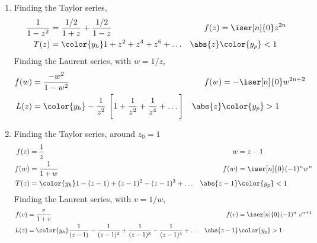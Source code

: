 \begin{enumerate}
    \item Finding the Taylor series,
          \begin{align}
              \frac{1}{1-z^2} & = \frac{1/2}{1+z} + \frac{1/2}{1-z}       &
              f(z)            & = \iser[n]{0} z^{2n}                        \\
              T(z)            & = \color{y_h} 1 + z^2 + z^4 + z^6 + \dots &
              \abs{z}         & \color{y_p} < 1
          \end{align}
          Finding the Laurent series, with $ w = 1/z $,
          \begin{align}
              f(w)    & = \frac{-w^2}{1 - w^2}                                 &
              f(w)    & = -\iser[n]{0} w^{2n + 2}                                \\
              L(z)    & = \color{y_h} -\frac{1}{z^2}\ \Bigg[ 1 + \frac{1}{z^2}
                  + \frac{1}{z^4} + \dots
              \Bigg]  &
              \abs{z} & \color{y_p} > 1
          \end{align}

    \item Finding the Taylor series, around $ z_0 = 1 $
          \begin{align}
              f(z)        & = \frac{1}{z}                                       &
              w           & = z - 1                                               \\
              f(w)        & = \frac{1}{1 + w}                                   &
              f(w)        & = \iser[n]{0} (-1)^n w^{n}                            \\
              T(z)        & = \color{y_h} 1 - (z-1) + (z-1)^2 - (z-1)^3 + \dots &
              \abs{z - 1} & \color{y_p} < 1
          \end{align}
          Finding the Laurent series, with $ v = 1/w $,
          \begin{align}
              f(v)        & = \frac{v}{1 + v}                                   &
              f(v)        & = \iser[n]{0} (-1)^n\ v^{n+1}                         \\
              L(z)        & = \color{y_h} \frac{1}{(z - 1)} - \frac{1}{(z-1)^2}
              + \frac{1}{(z-1)^3} - \frac{1}{(z - 1)^4}
              + \dots     &
              \abs{z - 1} & \color{y_p} > 1
          \end{align}


\end{enumerate}
